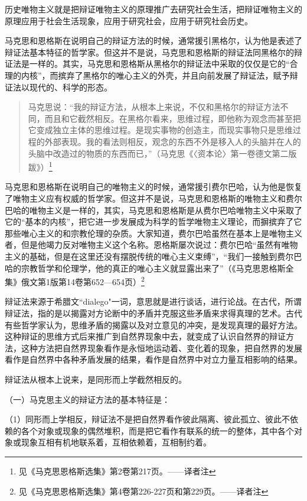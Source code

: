 历史唯物主义就是把辩证唯物主义的原理推广去研究社会生活，把辩证唯物主义的原理应用于社会生活现象，应用于研究社会，应用于研究社会历史。

马克思和恩格斯在说明自己的辩证方法的时候，通常援引黑格尔，认为他是表述了辩证法基本特征的哲学家。但这并不是说，马克思和恩格斯的辩证法同黑格尔的辩证法是一样的。其实，马克思和恩格斯从黑格尔的辩证法中采取的仅仅是它的“合理的内核”，而摈弃了黑格尔的唯心主义的外壳，并且向前发展了辩证法，赋予辩证法以现代的、科学的形态。

\begin{quotation}
马克思说：“我的辩证方法，从根本上来说，不仅和黑格尔的辩证方法不同，而且和它截然相反。在黑格尔看来，思维过程，即他称为观念而甚至把它变成独立主体的思维过程。是现实事物的创造主，而现实事物只是思维过程的外部表现。我的看法则相反，观念的东西不外是移入人的头脑并在人的头脑中改造过的物质的东西而已，”（马克思《〈资本论〉第一卷德文第二版跋》）\footnote{见《马克思恩格斯选集》第2卷第217页。——译者注}
\end{quotation}

马克思和恩格斯在说明自己的唯物主义的时候，通常援引费尔巴哈，认为他是恢复了唯物主义应有权威的哲学家。但这并不是说，马克思和恩格斯的唯物主义和费尔巴哈的唯物主义是一样的，其实，马克思和恩格斯是从费尔巴哈唯物主义中采取了它的“基本的内核”，把它进一步发展成为科学的哲学唯物主义理论，而摒摈弃了它那些唯心主义的和宗教伦理的杂质。大家知道，费尔巴哈虽然在基本上是唯物主义者，但是他竭力反对唯物主义这个名称。恩格斯屡次说过：费尔巴哈“虽然有唯物主义的基础，但是在这里还没有摆脱传统的唯心主义束缚”，“我们一接触到费尔巴哈的宗教哲学和伦理学，他的真正的唯心主义就显露出来了”（《马克思恩格斯全集》俄文第1版第14卷第652—654页）\footnote{见《马克思恩格斯选集》第4卷第226-227页和第229页。——译者注}

辩证法来源于希腊文``dialego"一词，意思就是进行谈话，进行论战。在古代，所谓辩证法，指的是以揭露对方论断中的矛盾并克服这些矛盾来求得真理的艺术。古代有些哲学家认为，思维矛盾的揭露以及对立意见的冲突，是发现真理的最好方法。这种辩证的思维方式后来推广到自然界现象中去，就变成了认识自然界的辩证方法，这种方法把自然界现象看作是永恒地运动着、变化着的现象，把自然界的发展看作是自然界中各种矛盾发展的结果，看作是自然界中对立力量互相影响的结果。

辩证法从根本上说来，是同形而上学截然相反的。

（一）马克思主义的辩证方法的基本特征是：

（1）同形而上学相反，辩证法不是把自然界看作彼此隔离、彼此孤立、彼此不依赖的各个对象或现象的偶然堆积，而是把它看作有联系的统一的整体，其中各个对象或现象互相有机地联系着，互相依赖着，互相制约着。

